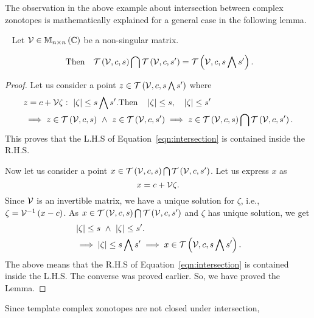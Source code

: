 The observation in the above example about intersection between
complex zonotopes is mathematically explained for a general case in
the following lemma.
%
\begin{lemma}~\label{lem:intersection}
Let ${\mathcal{V}\in\mathbb{M}_{n\times n}\left(\mathbb{C}\right)}$ be a non-singular matrix.  

%
\begin{equation}~\label{eqn:intersection}
\text{Then}\hspace{1em}\mathit{\operatorname{\mathcal{T}}}\left(\mathcal{V},c,s\right)\bigcap\mathit{\operatorname{\mathcal{T}}}\left(\mathcal{V},c,s^\prime\right)=\mathit{\operatorname{\mathcal{T}}}\left(\mathcal{V},c,s\bigwedge s^\prime\right).
\end{equation}
%
\end{lemma}
%
\begin{proof}
  Let us consider a
point $z\in\mathit{\operatorname{\mathcal{T}}}\left(\mathcal{V},c,s\bigwedge s^\prime\right)$ where
%
\begin{align*}
& z=c+\mathcal{V}\zeta:~\left|\zeta\right|\leq s\bigwedge s^\prime.
 \text{Then}\hspace{1em}\left|\zeta\right|\leq s,\hspace{1em}
  \left|\zeta\right|\leq s^\prime\\
& \implies {z\in\mathit{\operatorname{\mathcal{T}}}\left(\mathcal{V},c,s\right)}~\wedge~
           {z\in\mathit{\operatorname{\mathcal{T}}}\left(\mathcal{V},c,s^\prime\right)}
 \implies z\in
\mathit{\operatorname{\mathcal{T}}}\left(\mathcal{V},c,s\right)\bigcap\mathit{\operatorname{\mathcal{T}}}\left(\mathcal{V},c,s^\prime\right).           
\end{align*}
%
This proves that the L.H.S of Equation~\ref{eqn:intersection}
is contained inside the R.H.S.

Now let us consider a point
$x\in\mathit{\operatorname{\mathcal{T}}}\left(\mathcal{V},c,s\right)\bigcap\mathit{\operatorname{\mathcal{T}}}\left(\mathcal{V},c,s^\prime\right)$.
Let us express $x$ as 
%
\[
x=c+\mathcal{V}\zeta.
\]
%
Since $\mathcal{V}$ is an invertible matrix, we have a unique solution for
$\zeta$, i.e.,
$\zeta=\mathcal{V}^{-1}\left(x-c\right)$.  As
${x\in\mathit{\operatorname{\mathcal{T}}}\left(\mathcal{V},c,s\right)}
\bigcap\mathit{\operatorname{\mathcal{T}}}\left(\mathcal{V},c,s^\prime\right)$ and $\zeta$ has unique solution, we get
%
\begin{align*}
  &  \left|\zeta\right|
 \leq
s~\wedge~\left|\zeta\right|\leq
s^\prime.\\
& \implies \left|\zeta\right|\leq s\bigwedge s^\prime
\implies x\in\mathit{\operatorname{\mathcal{T}}}\left(\mathcal{V},c,s\bigwedge s^\prime\right).
\end{align*}
%
The above means that the R.H.S of Equation~\ref{eqn:intersection} is
contained inside the L.H.S.  The converse was proved earlier.  So, we
have proved the Lemma.
\end{proof}
%
Since template complex zonotopes are not closed under intersection,
